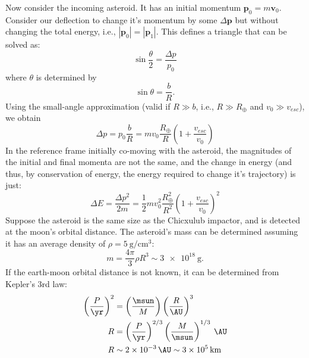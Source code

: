 \documentclass{article}
\begin{document}
        Now consider the incoming asteroid.  It has an initial momentum $\mathbf{p}_{0}=m\mathbf{v}_{0}$.  Consider our deflection to change it's momentum by some $\Delta \mathbf{p}$ but without changing the total energy, i.e., $|\mathbf{p}_{0}|=|\mathbf{p}_{1}|$.  This defines a triangle that can be solved as:
        \begin{equation}
                \sin\frac{\theta}{2} = \frac{\Delta p}{p_{0}}
        \end{equation}
        where $\theta$ is determined by
        \begin{equation}
                \sin\theta = \frac{b}{R}.
        \end{equation}
        Using the small-angle approximation (valid if $R\gg b$, i.e., $R\gg R_{\oplus}$ and $v_{0}\gg v_{esc}$), we obtain
        \begin{equation}
                \Delta p = p_{0}\frac{b}{R} = mv_{0}\frac{R_{\oplus}}{R}\left(1+\frac{v_{esc}}{v_{0}}\right)
        \end{equation}
        In the reference frame initially co-moving with the asteroid, the magnitudes of the initial and final momenta are not the same, and the change in energy (and thus, by conservation of energy, the energy required to change it's trajectory) is just:
        \begin{equation}
                \Delta E = \frac{\Delta p^{2}}{2m} = \frac{1}{2}mv_{0}^{2}\frac{R_{\oplus}^{2}}{R^{2}}\left(1+\frac{v_{esc}}{v_{0}}\right)^{2}
        \end{equation}
        Suppose the asteroid is the same size as the Chicxulub impactor, and is detected at the moon's orbital distance.  The asteroid's mass can be determined assuming it has an average density of $\rho=\SI{5}{\gram\per\cm\cubed}$:
        \begin{equation}
                m = \frac{4\pi}{3}\rho R^{3} \sim \SI{3e18}{\gram}.
        \end{equation}
        If the earth-moon orbital distance is not known, it can be determined from Kepler's 3rd law:
        \begin{align}
                \left(\frac{P}{\si{\yr}}\right)^{2} &= \left(\frac{\si{\msun}}{M}\right)\left(\frac{R}{\si{\AU}}\right)^{3}\\
                R &= \left(\frac{P}{\si{\yr}}\right)^{2/3}\left(\frac{M}{\si{\msun}}\right)^{1/3}\:\si{\AU}\\
                R &\sim \SI{2e-3}{\AU} \sim \SI{3e5}{\km}
        \end{align}
\end{document}
